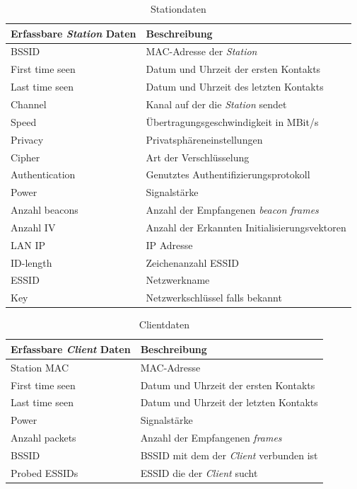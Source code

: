 \documentclass[]{report}
\begin{document}
\begin{center}
\begin{table}
\caption{Stationdaten}\label{tab:1}
  \begin{tabulary}{\textwidth}{l | L}
\toprule
Erfassbare \textit{Station} Daten & Beschreibung \\
\midrule
BSSID & MAC-Adresse der \textit{Station} \\
First time seen & Datum und Uhrzeit der ersten Kontakts \\
Last time seen & Datum und Uhrzeit des letzten Kontakts \\
Channel &  Kanal auf der die \textit{Station} sendet \\
Speed & Übertragungsgeschwindigkeit in MBit/s\\
Privacy & Privatsphäreneinstellungen \\
Cipher & Art der Verschlüsselung \\
Authentication & Genutztes Authentifizierungsprotokoll \\
Power & Signalstärke \\ 
Anzahl beacons & Anzahl der Empfangenen \textit{beacon frames}\\
Anzahl IV & Anzahl der Erkannten Initialisierungsvektoren \\
LAN IP &  IP Adresse \\
ID-length & Zeichenanzahl ESSID \\
ESSID & Netzwerkname \\
Key & Netzwerkschlüssel falls bekannt\\
\bottomrule
\end{tabulary}
\end{table}
\end{center} 
\begin{center}
\begin{table}
\caption{Clientdaten}\label{tab:2}
  \begin{tabulary}{\textwidth}{l | L}
\toprule
Erfassbare \textit{Client} Daten & Beschreibung \\
\midrule
Station MAC & MAC-Adresse\\
First time seen & Datum und Uhrzeit der ersten Kontakts \\
Last time seen & Datum und Uhrzeit der letzten Kontakts \\
Power & Signalstärke \\
Anzahl packets & Anzahl der Empfangenen \textit{frames} \\
BSSID & BSSID mit dem der \textit{Client} verbunden ist \\
Probed ESSIDs & ESSID die der \textit{Client} sucht \\
\bottomrule
\end{tabulary}
\end{table}
\end{center}
\end{document}
